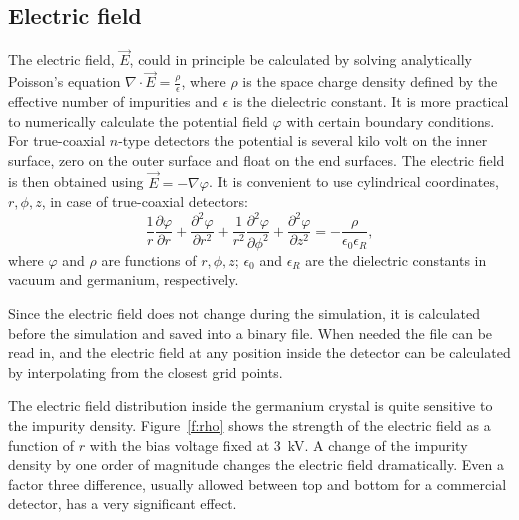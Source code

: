 \documentclass[epj,referee]{svjour}
\begin{document}
\subsection{Electric field}
\label{s:field}
The electric field, $\vec{E}$, could in principle be calculated by
solving analytically Poisson's equation $\nabla \cdot \vec{E} =
\frac{\rho}{\epsilon}$, where $\rho$ is the space charge density
defined by the effective number of impurities and $\epsilon$ is the
dielectric constant. It is more practical to numerically calculate the
potential field $\varphi$ with certain boundary conditions. For
true-coaxial $n$-type detectors the potential is several kilo volt on
the inner surface, zero on the outer surface and float on the end
surfaces. The electric field is then obtained using $\vec{E} = -
\nabla \varphi$. It is convenient to use cylindrical coordinates, $r,
\phi, z$, in case of true-coaxial detectors:
\begin{equation} 
\frac{1}{r} \frac{\partial \varphi}{\partial r} + 
\frac{\partial^{2} \varphi}{\partial r^{2}} + 
\frac{1}{r^{2}} \frac{\partial^{2} \varphi}{\partial \phi^{2}} + 
\frac{\partial^{2} \varphi}{\partial z^{2}} = 
- \frac{\rho}{\epsilon_{0} \epsilon_{R}}, 
\label{e:pocyl} 
\end{equation} 
where $\varphi$ and $\rho$ are functions of $r, \phi, z$;
$\epsilon_{0}$ and $\epsilon_{R}$ are the dielectric constants in
vacuum and germanium, respectively.

Since the electric field does not change during the simulation, it is
calculated before the simulation and saved into a binary file. When
needed the file can be read in, and the electric field at any position
inside the detector can be calculated by interpolating from the
closest grid points.
 
The electric field distribution inside the germanium crystal is quite
sensitive to the impurity density. Figure~\ref{f:rho} shows the
strength of the electric field as a function of $r$ with the bias
voltage fixed at 3~kV. A change of the impurity density by one order
of magnitude changes the electric field dramatically. Even a factor
three difference, usually allowed between top and bottom for a
commercial detector, has a very significant effect.
 
\end{document}
